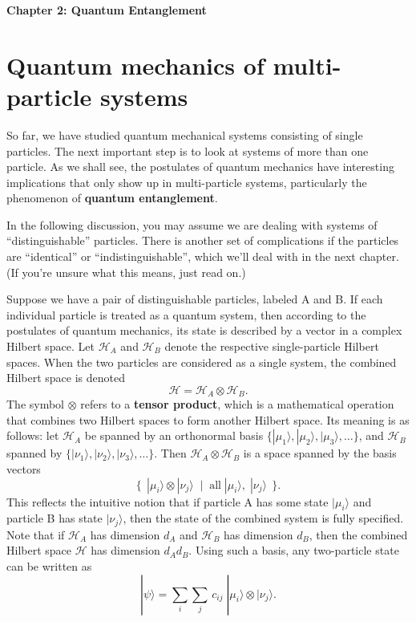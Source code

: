 \documentclass[pra,12pt]{revtex4}
\begin{document}
\begin{center}
{\Large \textbf{Chapter 2: Quantum Entanglement}}
\end{center}

\section{Quantum mechanics of multi-particle systems}
\label{sec:tensorprod}

So far, we have studied quantum mechanical systems consisting of
single particles.  The next important step is to look at systems of
more than one particle.  As we shall see, the postulates of quantum
mechanics have interesting implications that only show up in
multi-particle systems, particularly the phenomenon of \textbf{quantum
  entanglement}.

In the following discussion, you may assume we are dealing with
systems of ``distinguishable'' particles.  There is another set of
complications if the particles are ``identical'' or
``indistinguishable'', which we'll deal with in the next chapter.  (If
you're unsure what this means, just read on.)

Suppose we have a pair of distinguishable particles, labeled A and B.
If each individual particle is treated as a quantum system, then
according to the postulates of quantum mechanics, its state is
described by a vector in a complex Hilbert space.  Let $\mathscr{H}_A$
and $\mathscr{H}_B$ denote the respective single-particle Hilbert
spaces.  When the two particles are considered as a single system, the
combined Hilbert space is denoted
\begin{equation}
  \mathscr{H} = \mathscr{H}_A\otimes \mathscr{H}_B.
\end{equation}
The symbol $\otimes$ refers to a \textbf{tensor product}, which is a
mathematical operation that combines two Hilbert spaces to form
another Hilbert space.  Its meaning is as follows: let $\mathscr{H}_A$
be spanned by an orthonormal basis $\{|\mu_1\rangle, |\mu_2\rangle,
|\mu_3\rangle, \dots\}$, and $\mathscr{H}_B$ spanned by
$\{|\nu_1\rangle, |\nu_2\rangle, |\nu_3\rangle, \dots\}$.  Then
$\mathscr{H}_A \otimes \mathscr{H}_B$ is a space spanned by the basis
vectors
\begin{equation}
  \Big\{\;\,|\mu_i\rangle\otimes|\nu_j\rangle \;\;  \Big| \;\; \textrm{all}\;|\mu_i\rangle,\; |\nu_j\rangle \;\,\Big\}.
\end{equation}
This reflects the intuitive notion that if particle A has some state
$|\mu_i\rangle$ and particle B has state $|\nu_j\rangle$, then the
state of the combined system is fully specified.  Note that if
$\mathscr{H}_A$ has dimension $d_A$ and $\mathscr{H}_B$ has dimension
$d_B$, then the combined Hilbert space $\mathscr{H}$ has dimension
$d_A d_B$.  Using such a basis, any two-particle state can be written as
\begin{equation}
  |\psi\rangle = \sum_{i} \sum_{j} \, c_{ij}\; |\mu_i\rangle \otimes |\nu_j\rangle.
\end{equation}
\end{document}
